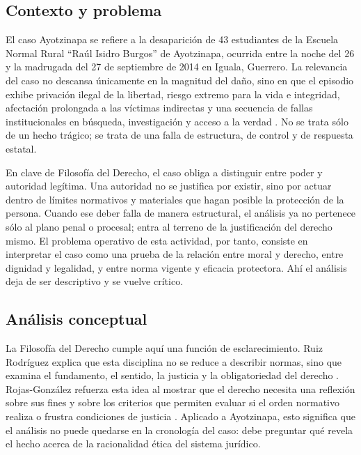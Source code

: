 \documentclass[
	spanish,
	letterpaper, oneside
]{article}
\begin{document}
\subsection{Contexto y problema}

El caso Ayotzinapa se refiere a la desaparición de 43 estudiantes de la Escuela Normal Rural ``Raúl Isidro Burgos'' de Ayotzinapa, ocurrida entre la noche del 26 y la madrugada del 27 de septiembre de 2014 en Iguala, Guerrero. La relevancia del caso no descansa únicamente en la magnitud del daño, sino en que el episodio exhibe privación ilegal de la libertad, riesgo extremo para la vida e integridad, afectación prolongada a las víctimas indirectas y una secuencia de fallas institucionales en búsqueda, investigación y acceso a la verdad \citep{casoAyotzinapaCNDH2024,lgmdfp2026}. No se trata sólo de un hecho trágico; se trata de una falla de estructura, de control y de respuesta estatal.

En clave de Filosofía del Derecho, el caso obliga a distinguir entre poder y autoridad legítima. Una autoridad no se justifica por existir, sino por actuar dentro de límites normativos y materiales que hagan posible la protección de la persona. Cuando ese deber falla de manera estructural, el análisis ya no pertenece sólo al plano penal o procesal; entra al terreno de la justificación del derecho mismo. El problema operativo de esta actividad, por tanto, consiste en interpretar el caso como una prueba de la relación entre moral y derecho, entre dignidad y legalidad, y entre norma vigente y eficacia protectora. Ahí el análisis deja de ser descriptivo y se vuelve crítico.

\noindent{}

\subsection{Análisis conceptual}

La Filosofía del Derecho cumple aquí una función de esclarecimiento. Ruiz Rodríguez explica que esta disciplina no se reduce a describir normas, sino que examina el fundamento, el sentido, la justicia y la obligatoriedad del derecho \citep{ruizrodriguezFilosofiaDerecho2009}. Rojas-González refuerza esta idea al mostrar que el derecho necesita una reflexión sobre sus fines y sobre los criterios que permiten evaluar si el orden normativo realiza o frustra condiciones de justicia \citep{rojasGonzalez2018}. Aplicado a Ayotzinapa, esto significa que el análisis no puede quedarse en la cronología del caso: debe preguntar qué revela el hecho acerca de la racionalidad ética del sistema jurídico.
\end{document}
